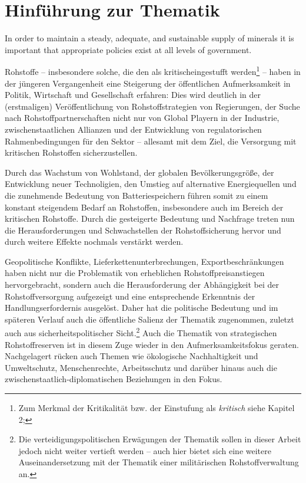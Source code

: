 \documentclass[12pt,a4paper,oneside]{book} %
\begin{document}
	
	
	
	\tableofcontents
	
	\chapter{Hinführung zur Thematik}
	
	\glqq In order to maintain a steady, adequate, and sustainable supply of minerals it is important that appropriate policies exist at all levels of government.\grqq \autocite{ Utilisation of multiple current and legacy datasets to create a national minerals inventory}
	
	Rohstoffe -- insbesondere solche, die den als \glqq kritisch\grqq eingestufft werden\footnote{Zum Merkmal der Kritikalität bzw. der Einstufung als \textit{kritisch} siehe Kapitel 2; } -- haben in der jüngeren Vergangenheit eine Steigerung der öffentlichen Aufmerksamkeit in Politik, Wirtschaft und Gesellschaft erfahren: Dies wird deutlich in der (erstmaligen) Veröffentlichung von Rohstoffstrategien von Regierungen, der Suche nach Rohstoffpartnerschaften nicht nur von Global Playern in der Industrie, zwischenstaatlichen Allianzen und der Entwicklung von regulatorischen Rahmenbedingungen für den Sektor -- allesamt mit dem Ziel, die Versorgung mit kritischen Rohstoffen sicherzustellen.
	
	Durch das Wachstum von Wohlstand, der globalen Bevölkerungsgröße, der Entwicklung neuer Technoligien, den Umstieg auf alternative Energiequellen und die zunehmende Bedeutung von Batteriespeichern führen somit zu einem konstant steigendem Bedarf an Rohstoffen, insbesondere auch im Bereich der kritischen Rohstoffe.\autocite{Frenz 2025, S. 76.} Durch die gesteigerte Bedeutung und Nachfrage treten nun die Herausforderungen und Schwachstellen der Rohstoffsicherung hervor und durch weitere Effekte nochmals verstärkt werden.
	
	Geopolitische Konflikte, Lieferkettenunterbrechungen, Exportbeschränkungen haben nicht nur die Problematik von erheblichen Rohstoffpreisanstiegen hervorgebracht, sondern auch die Herausforderung der Abhängigkeit bei der Rohstoffversorgung aufgezeigt und eine entsprechende Erkenntnis der Handlungserfordernis ausgelöst. Daher hat die politische Bedeutung und im späteren Verlauf auch die öffentliche Salienz der Thematik zugenommen, zuletzt auch aus sicherheitspolitischer Sicht.\footnote{Die verteidigungspolitischen Erwägungen der Thematik sollen in dieser Arbeit jedoch nicht weiter vertieft werden -- auch hier bietet sich eine weitere Auseinandersetzung mit der Thematik einer militärischen Rohstoffverwaltung an.} Auch die Thematik von strategischen Rohstoffreserven ist in diesem Zuge wieder in den Aufmerksamkeitsfokus geraten. Nachgelagert rücken auch Themen wie ökologische Nachhaltigkeit und Umweltschutz, Menschenrechte, Arbeitsschutz und darüber hinaus auch die zwischenstaatlich-diplomatischen Beziehungen in den Fokus. 
	
\end{document}
